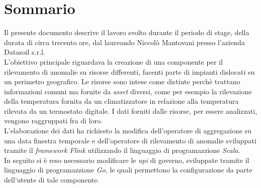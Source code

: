 
\cleardoublepage
{}
{}
\begingroup
\let\clearpage\relax
\let\cleardoublepage\relax
\let\cleardoublepage\relax

\chapter*{Sommario}

Il presente documento descrive il lavoro svolto durante il periodo di stage, della durata di circa trecento ore, dal laureando Niccolò Mantovani presso l'azienda Datasoil s.r.l.\\
L'obiettivo principale riguardava la creazione di una componente per il rilevamento di anomalie su risorse differenti, facenti parte di impianti dislocati su un perimetro geografico. Le risorse sono intese come distinte perchè trattano informazioni comuni ma fornite da \textit{asset} diversi, come per esempio la rilevazione della temperatura fornita da un climatizzatore in relazione alla temperatura rilevata da un termostato digitale. I dati forniti dalle risorse, per essere analizzati, vengono raggruppati fra di loro.\\
L'elaborazione dei dati ha richiesto la modifica dell'operatore di aggregazione su una data finestra temporale e dell'operatore di rilevamento di anomalie sviluppati tramite il \textit{\textit{\gls{framework}}} \textit{Flink} utilizzando il linguaggio di programazzione \textit{Scala}.\\
In seguito si è reso necessario modificare le \textit{\gls{api}} di governo, sviluppate tramite il linguaggio di programazzione \textit{Go}, le quali permettono la configurazione da parte dell'utente di tale componente.

%
%

\endgroup			

\vfill

